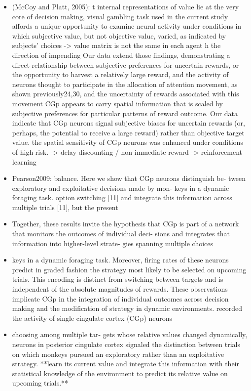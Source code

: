 \documentclass{article} %
\begin{document}
\begin{itemize}
\begin{itemize}
\item
(McCoy and Platt, 2005):
t internal representations of value lie at the very core of
decision making,
visual gambling task used in the current study affords a unique
opportunity to examine neural activity under conditions in which
subjective value, but not objective value, varied, as indicated by
subjects’ choices
-> value matrix is not the same in each agent
h the direction of impending
Our data extend those
findings, demonstrating a direct relationship between subjective preferences
for uncertain rewards, or the opportunity to harvest a
relatively large reward, and the activity of neurons thought to participate
in the allocation of attention
movement, as shown previously24,30, and the uncertainty of rewards
associated with this movement
CGp appears to carry spatial information that is scaled by
subjective preferences for particular patterns of reward outcome.
Our data indicate that CGp
neurons signal subjective biases for uncertain rewards (or, perhaps, the
potential to receive a large reward) rather than objective target value.
the spatial sensitivity of CGp neurons was enhanced under
conditions of high risk.
-> delay discounting / non-immediate reward -> reinforcement learning

\item
Pearson2009:
balance. Here we show that CGp neurons distinguish be- tween exploratory and exploitative decisions made by mon- keys in a dynamic foraging task.
 option switching [11] and integrate this information across multiple trials [11], but the present

 \item
 Together, these results invite the hypothesis that CGp is part of a network that monitors the outcomes of individual deci- sions and integrates that information into higher-level strate- gies spanning multiple choices

 \item
keys in a dynamic foraging task. Moreover, firing rates of these neurons predict in graded fashion the strategy most likely to be selected on upcoming trials. This encoding is distinct from switching between targets and is independent of the absolute magnitudes of rewards. These observations implicate CGp in the integration of individual outcomes across decision making and the modification of strategy in dynamic environments.
recorded the activity of single cingulate cortex (CGp) neurons

\item
choosing among multiple tar-
gets whose relative values changed dynamically,
neurons in posterior cingulate cortex signaled the distinction between trials on which monkeys pursued an exploratory rather than an exploitative strategy.
**learn its current value and integrate this information with their statistical knowledge of the environment to predict its relative value on upcoming trials.**



\end{itemize}
\end{itemize}
\end{document}
